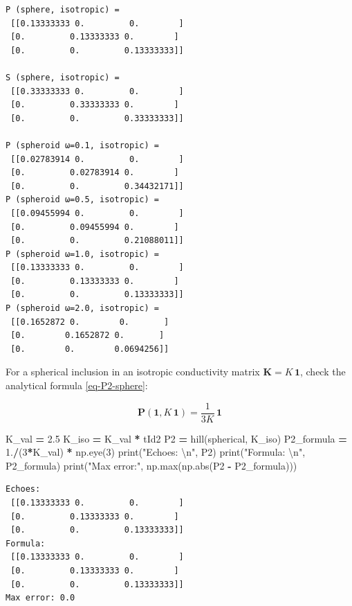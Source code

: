 \documentclass[
  a4paper,
  numbers=noendperiod,
  DIV=12]{scrreprt}
\newenvironment{Shaded}{\begin{snugshade}}{\end{snugshade}}
\newcommand{\BuiltInTok}[1]{#1}
\newcommand{\CharTok}[1]{\textcolor[rgb]{0.31,0.60,0.02}{#1}}
\newcommand{\DecValTok}[1]{\textcolor[rgb]{0.00,0.00,0.81}{#1}}
\newcommand{\FloatTok}[1]{\textcolor[rgb]{0.00,0.00,0.81}{#1}}
\newcommand{\NormalTok}[1]{#1}
\newcommand{\OperatorTok}[1]{\textcolor[rgb]{0.81,0.36,0.00}{\textbf{#1}}}
\newcommand{\StringTok}[1]{\textcolor[rgb]{0.31,0.60,0.02}{#1}}
\newcommand{\uu}[1]{{\symbf{{#1}}}}
\begin{document}
\begin{verbatim}
P (sphere, isotropic) =
 [[0.13333333 0.         0.        ]
 [0.         0.13333333 0.        ]
 [0.         0.         0.13333333]] 

S (sphere, isotropic) =
 [[0.33333333 0.         0.        ]
 [0.         0.33333333 0.        ]
 [0.         0.         0.33333333]] 

P (spheroid ω=0.1, isotropic) =
 [[0.02783914 0.         0.        ]
 [0.         0.02783914 0.        ]
 [0.         0.         0.34432171]]
P (spheroid ω=0.5, isotropic) =
 [[0.09455994 0.         0.        ]
 [0.         0.09455994 0.        ]
 [0.         0.         0.21088011]]
P (spheroid ω=1.0, isotropic) =
 [[0.13333333 0.         0.        ]
 [0.         0.13333333 0.        ]
 [0.         0.         0.13333333]]
P (spheroid ω=2.0, isotropic) =
 [[0.1652872 0.        0.       ]
 [0.        0.1652872 0.       ]
 [0.        0.        0.0694256]]
\end{verbatim}

\begin{tcolorbox}[enhanced jigsaw, arc=.35mm, bottomrule=.15mm, bottomtitle=1mm, breakable, colback=white, colbacktitle=quarto-callout-caution-color!10!white, colframe=quarto-callout-caution-color-frame, coltitle=black, left=2mm, leftrule=.75mm, opacityback=0, opacitybacktitle=0.6, rightrule=.15mm, title={Exercise}, titlerule=0mm, toprule=.15mm, toptitle=1mm]

For a spherical inclusion in an isotropic conductivity matrix
\(\uu{K}=K\,\uu{1}\), check the analytical formula \ref{eq-P2-sphere}:

\[\uu{P}(\uu{1},K\,\uu{1}) = \frac{1}{3K}\,\uu{1}\]

\begin{Shaded}
\begin{Highlighting}[]
\NormalTok{K\_val }\OperatorTok{=} \FloatTok{2.5}
\NormalTok{K\_iso }\OperatorTok{=}\NormalTok{ K\_val }\OperatorTok{*}\NormalTok{ tId2}
\NormalTok{P2 }\OperatorTok{=}\NormalTok{ hill(spherical, K\_iso)}
\NormalTok{P2\_formula }\OperatorTok{=} \FloatTok{1.}\OperatorTok{/}\NormalTok{(}\DecValTok{3}\OperatorTok{*}\NormalTok{K\_val) }\OperatorTok{*}\NormalTok{ np.eye(}\DecValTok{3}\NormalTok{)}
\BuiltInTok{print}\NormalTok{(}\StringTok{"Echoes:  }\CharTok{\textbackslash{}n}\StringTok{"}\NormalTok{, P2)}
\BuiltInTok{print}\NormalTok{(}\StringTok{"Formula: }\CharTok{\textbackslash{}n}\StringTok{"}\NormalTok{, P2\_formula)}
\BuiltInTok{print}\NormalTok{(}\StringTok{"Max error:"}\NormalTok{, np.}\BuiltInTok{max}\NormalTok{(np.}\BuiltInTok{abs}\NormalTok{(P2 }\OperatorTok{{-}}\NormalTok{ P2\_formula)))}
\end{Highlighting}
\end{Shaded}

\begin{verbatim}
Echoes:  
 [[0.13333333 0.         0.        ]
 [0.         0.13333333 0.        ]
 [0.         0.         0.13333333]]
Formula: 
 [[0.13333333 0.         0.        ]
 [0.         0.13333333 0.        ]
 [0.         0.         0.13333333]]
Max error: 0.0
\end{verbatim}

\end{tcolorbox}
\end{document}
